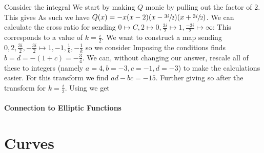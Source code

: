 \documentclass{article}
\begin{document}
\begin{example}
	Consider the integral 
We start by making $Q$ monic by pulling out the factor of $2$. This gives 
As such we have $Q(x) = -x(x-2)(x-\sfrac{3i}{2})(x+\sfrac{3i}{2})$. We can  calculate the cross ratio for sending $0 \mapsto C, 2 \mapsto 0, \frac{3i}{2} \mapsto 1, \frac{-3i}{2}\mapsto \infty$:
This corresponds to a value of $k=\frac{i}{2}$. We want to construct a map sending $0,2,\frac{3i}{2},-\frac{3i}{2} \mapsto 1,-1,\frac{1}{k}, -\frac{1}{k}$ so we consider 
Imposing the conditions finds $b=d=-(1+c) = -\frac{3}{4}$. We can, without changing our answer, rescale all of these to integers (namely $a=4, b=-3, c=-1, d=-3$) to make the calculations easier. For this transform we find $ad-bc=-15$. Further
giving 
so after the transform 
for $k=\frac{i}{2}$. Using 
we get 
\end{example}

\subsection{Connection to Elliptic Functions}


\part{Curves}

	


\end{document}
